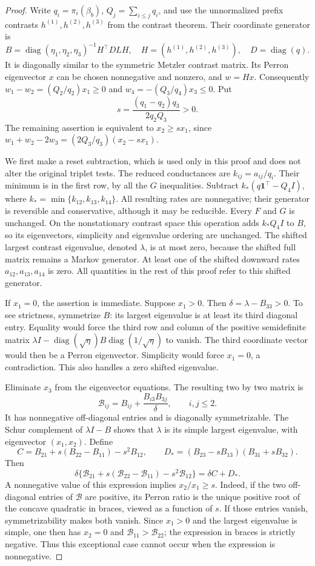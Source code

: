 \begin{proof}
Write $q_i=\pi_i(\beta_b)$, $Q_j=\sum_{i\leq j}q_i$, and use the
unnormalized prefix contrasts $h^{(1)},h^{(2)},h^{(3)}$ from the contrast
theorem. Their coordinate generator is
\[
B=\operatorname{diag}(\eta_1,\eta_2,\eta_3)^{-1}H^\top D L H,
\quad H=(h^{(1)},h^{(2)},h^{(3)}),\quad D=\operatorname{diag}(q).
\]
It is diagonally similar to the symmetric Metzler contrast matrix. Its
Perron eigenvector $x$ can be chosen nonnegative and nonzero, and $w=Hx$.
Consequently $w_1-w_2=(Q_2/q_2)x_1\geq0$ and
$w_4=-(Q_3/q_4)x_3\leq0$. Put
\[
s=\frac{(q_1-q_2)q_3}{2q_2Q_3}>0.
\]
The remaining assertion is equivalent to $x_2\geq sx_1$, since
$w_1+w_2-2w_3=(2Q_3/q_3)(x_2-sx_1)$.

We first make a reset subtraction, which is used only in this proof and
does not alter the original triplet tests. The reduced conductances are
$k_{ij}=a_{ij}/q_i$. Their minimum is in the first row, by all the $G$
inequalities. Subtract
$k_* (q\mathbf1^\top-Q_4 I)$, where
$k_* =\min\{k_{12},k_{13},k_{14}\}$.
All resulting rates are nonnegative; their generator is reversible and
conservative, although it may be reducible. Every $F$ and $G$ is unchanged.
On the nonstationary contrast space this operation adds $k_*Q_4I$ to $B$,
so its eigenvectors, simplicity and eigenvalue ordering are unchanged.
The shifted largest contrast eigenvalue, denoted $\lambda$, is at most zero,
because the shifted full matrix remains a Markov generator. At least one
of the shifted downward rates $a_{12},a_{13},a_{14}$ is zero. All quantities
in the rest of this proof refer to this shifted generator.

If $x_1=0$, the assertion is immediate. Suppose $x_1>0$. Then
$\delta=\lambda-B_{33}>0$. To see strictness, symmetrize $B$: its largest
eigenvalue is at least its third diagonal entry. Equality would force the
third row and column of the positive semidefinite matrix
$\lambda I-\operatorname{diag}(\sqrt\eta)B
\operatorname{diag}(1/\sqrt\eta)$ to vanish. The third coordinate vector
would then be a Perron eigenvector. Simplicity would force $x_1=0$, a
contradiction. This also handles a zero shifted eigenvalue.

Eliminate $x_3$ from the eigenvector equations. The resulting two by two
matrix is
\[
\mathcal B_{ij}=B_{ij}+\frac{B_{i3}B_{3j}}{\delta},\qquad i,j\leq2.
\]
It has nonnegative off-diagonal entries and is diagonally symmetrizable.
The Schur complement of $\lambda I-B$ shows that $\lambda$ is its simple
largest eigenvalue, with eigenvector $(x_1,x_2)$.
Define
\[
C=B_{21}+s(B_{22}-B_{11})-s^2B_{12},\qquad
D_*=(B_{23}-sB_{13})(B_{31}+sB_{32}).
\]
Then
\[
\delta\{\mathcal B_{21}+s(\mathcal B_{22}-\mathcal B_{11})
-s^2\mathcal B_{12}\}=\delta C+D_*.
\]
A nonnegative value of this expression implies $x_2/x_1\geq s$. Indeed,
if the two off-diagonal entries of $\mathcal B$ are positive, its Perron
ratio is the unique positive root of the concave quadratic in braces,
viewed as a function of $s$. If those entries vanish, symmetrizability makes
both vanish. Since $x_1>0$ and the largest eigenvalue is simple, one then
has $x_2=0$ and $\mathcal B_{11}>\mathcal B_{22}$; the expression in braces
is strictly negative. Thus this exceptional case cannot occur when the
expression is nonnegative.


\end{proof}
